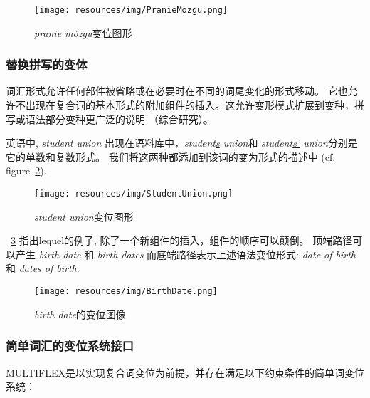 \begin{figure}[!htb]
  \centering
  \texttt{[image: resources/img/PranieMozgu.png]}
  \caption{ \emph{pranie m\'ozgu}变位图形}
  \label{fig:PranieMozgu}
\end{figure}


\subsubsection{替换拼写的变体}
词汇形式允许任何部件被省略或在必要时在不同的词尾变化的形式移动。
它也允许不出现在复合词的基本形式的附加组件的插入。这允许变形模式扩展到变种，拼写或语法部分变种更广泛的说明
（综合研究\cite{Jacquemin01}）。

英语中, 
\emph{student union} 出现在语料库中，\emph{student\underline{s} union}和 
\emph{student\underline{s'} union}分别是它的单数和复数形式。
我们将这两种都添加到该词的变为形式的描述中 (cf. figure~\ref{fig:StudentUnion}).

\begin{figure}[!htb]
  \centering
  \texttt{[image: resources/img/StudentUnion.png]}
  \caption{ \emph{student union}变位图形}
  \label{fig:StudentUnion}
\end{figure}

\bigskip
\noindent ~\ref{fig:BirthDate} 指出lequel的例子, 除了一个新组件的插入，组件的顺序可以颠倒。
顶端路径可以产生 \emph{birth date} 和 \emph{birth dates} 而底端路径表示上述语法变位形式: \emph{date of birth} 和 \emph{dates of birth}.

\begin{figure}[!htb]
  \centering
  \texttt{[image: resources/img/BirthDate.png]}
  \caption{\emph{birth date}的变位图像}
  \label{fig:BirthDate}
\end{figure}

\subsubsection{简单词汇的变位系统接口}
\label{Interface}

MULTIFLEX是以实现复合词变位为前提，并存在满足以下约束条件的简单词变位系统：

